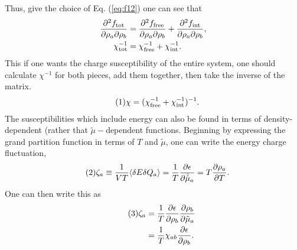 \documentclass[12pt]{article}
\numberwithin{equation}{section}
\numberwithin{figure}{section}
\newcommand\eqnumber{\addtocounter{equation}{1}\tag{\theequation}}
\begin{document}
Thus, give the choice of Eq. (\ref{eq:f12}) one can see that
\begin{align*}
\frac{\partial^2f_{\rm tot}}{\partial\rho_a\partial\rho_b}&=
\frac{\partial^2f_{\rm free}}{\partial\rho_a\partial\rho_b}+\frac{\partial^2f_{\rm int}}{\partial\rho_a\partial\rho_b},\\
\chi^{-1}_{\rm tot}&=\chi^{-1}_{\rm free}+\chi^{-1}_{\rm int}.
\end{align*}
This if one wants the charge susceptibility of the entire system, one should calculate $\chi^{-1}$ for both pieces, add them together, then take the inverse of the matrix.
\begin{align*}\eqnumber
\chi&=(\chi^{-1}_{\rm free}+\chi^{-1}_{\rm int})^{-1}.
\end{align*}
The susceptibilities which include energy can also be found in terms of density-dependent (rather that $\tilde{\mu}-$dependent functions. Beginning by expressing the grand partition function in terms of $T$ and $\tilde{\mu}$, one can write the energy charge fluctuation,
\begin{align*}\eqnumber
\zeta_a&\equiv\frac{1}{VT}\langle\delta E\delta Q_a\rangle=\frac{1}{T}\frac{\partial\epsilon}{\partial\tilde{\tilde{\mu}}_a}
=T\frac{\partial\rho_a}{\partial T}.
\end{align*}
One can then write this as
\begin{align*}\eqnumber
\zeta_a&=\frac{1}{T}\frac{\partial\epsilon}{\partial\rho_b}\frac{\partial\rho_b}{\partial\tilde{\mu}_a}\\
&=\frac{1}{T}\chi_{ab}\frac{\partial\epsilon}{\partial\rho_b}.
\end{align*}
\end{document}
